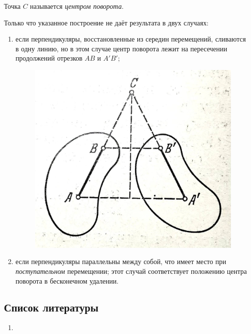 \begin{definition}
  Точка $C$ называется \textit{центром поворота}.
\end{definition}

\begin{remark}
  Только что указанное построение не даёт результата в двух случаях:
  \begin{enumerate}
    \item если перпендикуляры, восстановленные из середин перемещений, сливаются
      в одну линию, но в этом случае центр поворота лежит на пересечении
      продолжений отрезков $AB$ и $A'B'$;

      \begin{figure}[H]
        \centering
        \resizebox{\linewidth}{!}
          {\includegraphics{src/mechanics/pictures/15_4.jpg}}

        \caption{}
        \label{fig:15_4}
      \end{figure}

    \item если перпендикуляры параллельны между собой, что имеет место при
      \textit{поступательном} перемещении; этот случай соответствует положению
      центра поворота в бесконечном удалении.
  \end{enumerate}

\end{remark}

\subsection{Список литературы}
\begin{enumerate}
  \item \cite{lourie}
\end{enumerate}

